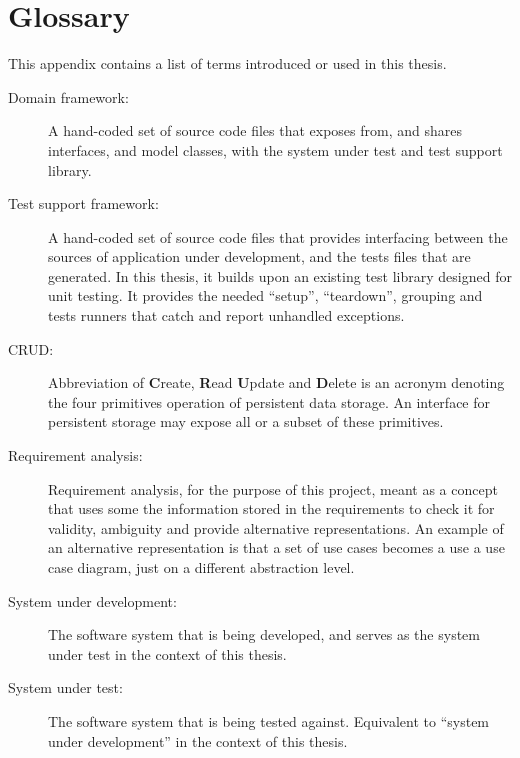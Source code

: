 \chapter{Glossary}
\label{appendix:glossary}
This appendix contains a list of terms introduced or used in this thesis.
\begin{description}

  \item[Domain framework:] A hand-coded set of source code files that exposes from, and shares interfaces, and model classes, with the system under test and test support library.

  \item[Test support framework:] A hand-coded set of source code files that provides interfacing between the sources of application under development, and the tests files that are generated. In this thesis, it builds upon an existing test library designed for unit testing. It provides the needed ``setup'', ``teardown'', grouping and tests runners that catch and report unhandled exceptions.

  \item[CRUD:] Abbreviation of \textbf{C}reate, \textbf{R}ead \textbf{U}pdate and \textbf{D}elete is an acronym denoting the four primitives operation of persistent data storage. An interface for persistent storage may expose all or a subset of these primitives.

  \item[Requirement analysis:] Requirement analysis, for the purpose of this project, meant as a concept that uses some the information stored in the requirements to check it for validity, ambiguity and provide alternative representations. An example of an alternative representation is that a set of use cases becomes a use a use case diagram, just on a different abstraction level.
  
  \item[System under development:] The software system that is being developed, and serves as the system under test in the context of this thesis.
  
  \item[System under test:] The software system that is being tested against. Equivalent to ``system under development'' in the context of this thesis.
  
\end{description}
